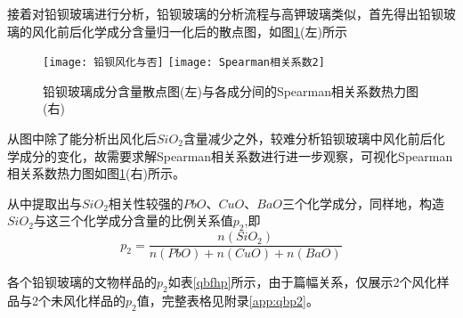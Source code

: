 \documentclass[withoutpreface,bwprint]{cumcmthesis} %
\begin{document}
接着对铅钡玻璃进行分析，铅钡玻璃的分析流程与高钾玻璃类似，首先得出铅钡玻璃的风化前后化学成分含量归一化后的散点图，如图\ref{qbfh}(左)所示


\begin{figure}[!h]
	\centering
	\texttt{[image: 铅钡风化与否]}
	\texttt{[image: Spearman相关系数2]}
	\caption{铅钡玻璃成分含量散点图(左)与各成分间的Spearman相关系数热力图(右)}
	\label{qbfh}
\end{figure}


从图中除了能分析出风化后$SiO_{2}$含量减少之外，较难分析铅钡玻璃中风化前后化学成分的变化，故需要求解Spearman相关系数进行进一步观察，可视化Spearman相关系数热力图如图\ref{qbfh}(右)所示。


从中提取出与$SiO_{2}$相关性较强的$PbO$、$CuO$、$BaO$三个化学成分，同样地，构造$SiO_{2}$与这三个化学成分含量的比例关系值$p_{2}$,即 $$p_{2}=\frac{n(SiO_{2})}{n(PbO)+n(CuO)+n(BaO)}$$


各个铅钡玻璃的文物样品的$p_{2}$如表\ref{qbfhp}所示，由于篇幅关系，仅展示2个风化样品与2个未风化样品的$p_{2}$值，完整表格见附录\ref{app:qbp2}。
\end{document}

